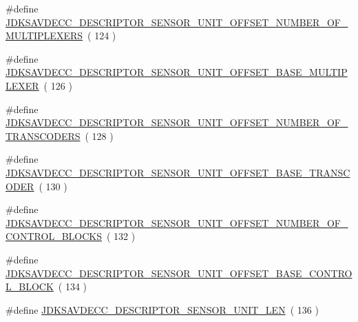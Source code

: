 \begin{DoxyCompactItemize}
\item 
\#define \hyperlink{group__descriptor__sensor_gadbb2e23d4eca8025f51173faa04365c5}{J\+D\+K\+S\+A\+V\+D\+E\+C\+C\+\_\+\+D\+E\+S\+C\+R\+I\+P\+T\+O\+R\+\_\+\+S\+E\+N\+S\+O\+R\+\_\+\+U\+N\+I\+T\+\_\+\+O\+F\+F\+S\+E\+T\+\_\+\+N\+U\+M\+B\+E\+R\+\_\+\+O\+F\+\_\+\+M\+U\+L\+T\+I\+P\+L\+E\+X\+E\+RS}~( 124 )
\item 
\#define \hyperlink{group__descriptor__sensor_ga306145716f08f4a05ca0dc9400fe4817}{J\+D\+K\+S\+A\+V\+D\+E\+C\+C\+\_\+\+D\+E\+S\+C\+R\+I\+P\+T\+O\+R\+\_\+\+S\+E\+N\+S\+O\+R\+\_\+\+U\+N\+I\+T\+\_\+\+O\+F\+F\+S\+E\+T\+\_\+\+B\+A\+S\+E\+\_\+\+M\+U\+L\+T\+I\+P\+L\+E\+X\+ER}~( 126 )
\item 
\#define \hyperlink{group__descriptor__sensor_ga0a9b636689251d9c2247a24861fc7fca}{J\+D\+K\+S\+A\+V\+D\+E\+C\+C\+\_\+\+D\+E\+S\+C\+R\+I\+P\+T\+O\+R\+\_\+\+S\+E\+N\+S\+O\+R\+\_\+\+U\+N\+I\+T\+\_\+\+O\+F\+F\+S\+E\+T\+\_\+\+N\+U\+M\+B\+E\+R\+\_\+\+O\+F\+\_\+\+T\+R\+A\+N\+S\+C\+O\+D\+E\+RS}~( 128 )
\item 
\#define \hyperlink{group__descriptor__sensor_ga448205c1de0d95468d4bfc81c8bdaff5}{J\+D\+K\+S\+A\+V\+D\+E\+C\+C\+\_\+\+D\+E\+S\+C\+R\+I\+P\+T\+O\+R\+\_\+\+S\+E\+N\+S\+O\+R\+\_\+\+U\+N\+I\+T\+\_\+\+O\+F\+F\+S\+E\+T\+\_\+\+B\+A\+S\+E\+\_\+\+T\+R\+A\+N\+S\+C\+O\+D\+ER}~( 130 )
\item 
\#define \hyperlink{group__descriptor__sensor_gacce058b8b29a929d69fc4e52d062412e}{J\+D\+K\+S\+A\+V\+D\+E\+C\+C\+\_\+\+D\+E\+S\+C\+R\+I\+P\+T\+O\+R\+\_\+\+S\+E\+N\+S\+O\+R\+\_\+\+U\+N\+I\+T\+\_\+\+O\+F\+F\+S\+E\+T\+\_\+\+N\+U\+M\+B\+E\+R\+\_\+\+O\+F\+\_\+\+C\+O\+N\+T\+R\+O\+L\+\_\+\+B\+L\+O\+C\+KS}~( 132 )
\item 
\#define \hyperlink{group__descriptor__sensor_ga787856dfb37f5f127bd7bdd27ee8c0d6}{J\+D\+K\+S\+A\+V\+D\+E\+C\+C\+\_\+\+D\+E\+S\+C\+R\+I\+P\+T\+O\+R\+\_\+\+S\+E\+N\+S\+O\+R\+\_\+\+U\+N\+I\+T\+\_\+\+O\+F\+F\+S\+E\+T\+\_\+\+B\+A\+S\+E\+\_\+\+C\+O\+N\+T\+R\+O\+L\+\_\+\+B\+L\+O\+CK}~( 134 )
\item 
\#define \hyperlink{group__descriptor__sensor_ga86d13f35db3884976a492d3e35f9f853}{J\+D\+K\+S\+A\+V\+D\+E\+C\+C\+\_\+\+D\+E\+S\+C\+R\+I\+P\+T\+O\+R\+\_\+\+S\+E\+N\+S\+O\+R\+\_\+\+U\+N\+I\+T\+\_\+\+L\+EN}~( 136 )
\end{DoxyCompactItemize}
